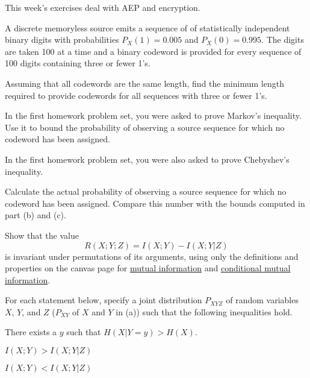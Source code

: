 \documentclass[a4paper,10pt,landscape,twocolumn]{scrartcl}
\begin{document}
\practiceproblems

{\sffamily\noindent
This week's exercises deal with AEP and encryption.  \practiceinstructions
}

\begin{exercise}
A discrete memoryless source emits a sequence of of statistically independent binary digits with probabilities $P_X(1) = 0.005$ and $P_X(0) = 0.995$. The digits are taken 100 at a time and a binary codeword is provided for every sequence of 100 digits containing three or fewer 1's.
	\begin{subex}
	Assuming that all codewords are the same length, find the minimum length required to
provide codewords for all sequences with three or fewer 1's.
	\end{subex}
	\begin{subex}
		In the first homework problem set, you were asked to prove Markov's inequality.
		Use it to bound the probability of observing a source sequence for
		which no codeword has been assigned.
	\end{subex}
    \begin{subex}
    	In the first homework problem set, you were also asked to prove Chebyshev's inequality.
	\begin{subex}
	Calculate the actual probability of observing a source sequence for which no codeword has
been assigned. Compare this number with the bounds computed
in part (b) and (c).
	\end{subex}
	\end{subex}
\end{exercise}



\begin{exercise}
Show that the value
\[
R(X;Y;Z) = I(X;Y) - I(X;Y|Z)
\]
is invariant under permutations of its arguments, using only the definitions and properties on the canvas page for \href{https://canvas.uva.nl/courses/2205/pages/definition-mutual-information?module_item_id=17286}{mutual information} and \href{https://canvas.uva.nl/courses/2205/pages/definition-conditional-mutual-information?module_item_id=26474}{conditional mutual information}.
\end{exercise}

\begin{exercise}[]
For each statement below, specify a joint distribution $P_{XYZ}$ of random variables $X$, $Y$, and $Z$ ($P_{XY}$ of $X$ and $Y$ in (a)) such that the following inequalities hold.
\begin{subex}
There exists a $y$ such that $H(X|Y=y) > H(X)$.
\end{subex}
\begin{subex}
$I(X;Y) > I(X;Y|Z)$
\end{subex}
\begin{subex}
$I(X;Y) < I(X;Y|Z)$
\end{subex}
\end{exercise}
\end{document}

